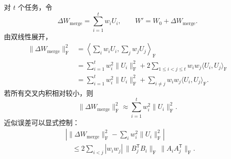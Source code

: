 \documentclass[11pt]{article}
\numberwithin{equation}{section}
\newcommand{\1}{\mathbf{1}}
\newcommand{\F}{\mathrm{F}}
\begin{document}
对 $t$ 个任务，令
\begin{equation}
  \Delta W_{\mathrm{merge}}
  =\sum_{i=1}^{t}w_iU_i,
  \qquad
  W'=W_0+\Delta W_{\mathrm{merge}}.
\end{equation}
由双线性展开，
\begin{align}
  \|\Delta W_{\mathrm{merge}}\|_\F^2
  &=\left\langle\sum_iw_iU_i,\sum_jw_jU_j\right\rangle_\F\\
  &=\sum_{i=1}^{t}w_i^2\|U_i\|_\F^2
   +2\sum_{1\le i<j\le t}w_iw_j\langle U_i,U_j\rangle_\F\\
  &=\sum_{i=1}^{t}w_i^2\|U_i\|_\F^2
   +\sum_{i\ne j}w_iw_j\langle U_i,U_j\rangle_\F.
  \label{eq:merge-exact}
\end{align}
若所有交叉内积相对较小，则
\begin{equation}
  \|\Delta W_{\mathrm{merge}}\|_\F^2
  \approx\sum_{i=1}^{t}w_i^2\|U_i\|_\F^2.
  \label{eq:merge-approx}
\end{equation}
近似误差可以显式控制：
\begin{align}
 &\left|
 \|\Delta W_{\mathrm{merge}}\|_\F^2
 -\sum_iw_i^2\|U_i\|_\F^2
 \right|\\
 &\quad\le
 2\sum_{i<j}|w_iw_j|\,
 \|B_j^{\mathsf{T}} B_i\|_\F\,
 \|A_iA_j^{\mathsf{T}}\|_\F.
 \label{eq:merge-error-bound}
\end{align}
\end{document}
